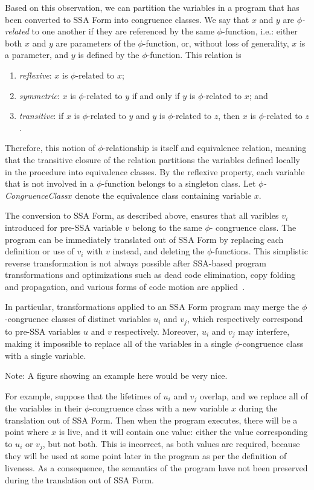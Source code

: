 Based on this observation, we can partition the variables in a 
program that has been converted to SSA Form into congruence classes. 
We say that $x$ and $y$ are \emph{$\phi$-related} to one another
if they are referenced by the same $\phi$-function, i.e.: 
either both $x$ and $y$ are parameters of the $\phi$-function, or,
without loss of generality, $x$ is a parameter, and $y$ is defined by
the $\phi$-function. This relation is
\begin{enumerate}
\item \emph{reflexive}: $x$ is $\phi$-related to $x$;
\item \emph{symmetric}: $x$ is $\phi$-related to $y$ if and only if
$y$ is $\phi$-related to $x$; and
\item \emph{transitive}: if $x$ is $\phi$-related to $y$ and 
$y$ is $\phi$-related to $z$, then $x$ is $\phi$-related to $z$.
\end{enumerate}
Therefore, this notion of $\phi$-relationship is itself and equivalence
relation, meaning that the transitive closure of the relation partitions
the variables defined locally in the procedure into equivalence classes. 
By the reflexive property, each variable that is not involved in a 
$\phi$-function belongs to a singleton class. 
Let \emph{$\phi$-CongruenceClass${x}$} denote the equivalence class 
containing variable $x$. 

The conversion to SSA Form, as described above, ensures that all varibles
$v_{i}$ introduced for pre-SSA variable $v$ belong to the same $\phi$-
congruence class. The program can be immediately translated out of SSA
Form by replacing each definition or use of $v_{i}$ with $v$ instead, 
and deleting the $\phi$-functions. This simplistic reverse transformation
is not always possible after SSA-based program transformations and 
optimizations such as dead code elimination, copy folding and propagation,
and various forms of code motion are applied~\cite{BriggsJul98}. 

In particular, transformations applied to an SSA Form program may
merge the $\phi$-congruence classes of distinct variables
$u_{i}$ and $v_{j}$, which respectively correspond to pre-SSA variables
$u$ and $v$ respectively. Moreover, $u_{i}$ and $v_{j}$ may interfere,
making it impossible to replace all of the variables in a single
$\phi$-congruence class with a single variable. 

Note: A figure showing an example here would be very nice.

For example, suppose
that the lifetimes of $u_{i}$ and $v_{j}$ overlap, and we replace all
of the variables in their $\phi$-congruence class with a new variable $x$
during the translation out of SSA Form. Then when the program executes,
there will be a point where $x$ is live, and it will contain one value: 
either the value corresponding to $u_{i}$ or $v_{j}$, but not both. 
This is incorrect, as both values are required, because they will be used
at some point later in the program as per the definition of liveness.
As a consequence, the semantics of the program have not been preserved
during the translation out of SSA Form. 

